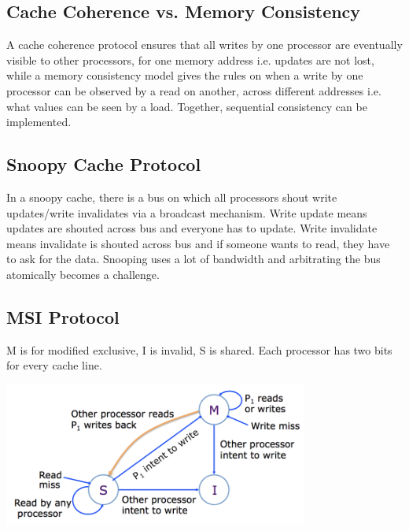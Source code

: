 \documentclass{article}
\begin{document}
\subsection{Cache Coherence vs. Memory Consistency}

A cache coherence protocol ensures that all writes by one processor are eventually visible to other processors, for one memory address i.e. updates are not lost, while a memory consistency model gives the rules on when a write by one processor can be observed by a read on another, across different addresses i.e. what values can be seen by a load. Together, sequential consistency can be implemented.

\subsection{Snoopy Cache Protocol}

In a snoopy cache, there is a bus on which all processors shout write updates/write invalidates via a broadcast mechanism. Write update means updates are shouted across bus and everyone has to update. Write invalidate means invalidate is shouted across bus and if someone wants to read, they have to ask for the data. Snooping uses a lot of bandwidth and arbitrating the bus atomically becomes a challenge.

\subsection{MSI Protocol}
M is for modified exclusive, I is invalid, S is shared. Each processor has two bits for every cache line.
\begin{center}
\includegraphics[width=0.75\textwidth]{msi}
\end{center}
\end{document}
